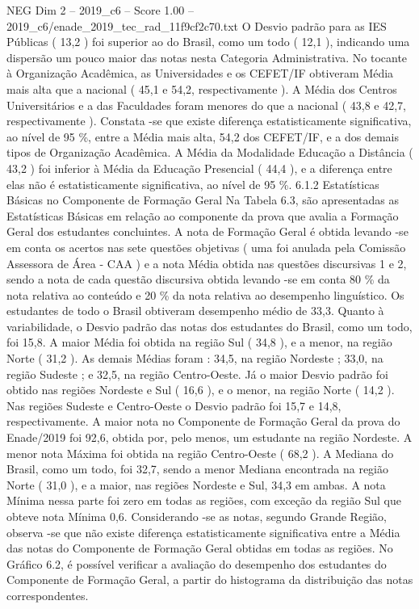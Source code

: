 \begin{textsample}{NEG Dim 2 – 2019\_c6 – Score 1.00 – 2019\_c6/enade\_2019\_tec\_rad\_11f9cf2c70.txt}
O Desvio padrão para as IES Públicas ( 13,2 ) foi superior ao do Brasil, como um todo ( 12,1 ), indicando uma dispersão um pouco maior das notas nesta Categoria Administrativa.
No tocante à Organização Acadêmica, as Universidades e os CEFET/IF obtiveram Média mais alta que a nacional ( 45,1 e 54,2, respectivamente ).
A Média dos Centros Universitários e a das Faculdades foram menores do que a nacional ( 43,8 e 42,7, respectivamente ).
Constata -se que existe diferença estatisticamente significativa, ao nível de 95 \%, entre a Média mais alta, 54,2 dos CEFET/IF, e a dos demais tipos de Organização Acadêmica.
A Média da Modalidade Educação a Distância ( 43,2 ) foi inferior à Média da Educação Presencial ( 44,4 ), e a diferença entre elas não é estatisticamente significativa, ao nível de 95 \%. 6.1.2 Estatísticas Básicas no Componente de Formação Geral Na Tabela 6.3, são apresentadas as Estatísticas Básicas em relação ao componente da prova que avalia a Formação Geral dos estudantes concluintes.
A nota de Formação Geral é obtida levando -se em conta os acertos nas sete questões objetivas ( uma foi anulada pela Comissão Assessora de Área - CAA ) e a nota Média obtida nas questões discursivas 1 e 2, sendo a nota de cada questão discursiva obtida levando -se em conta 80 \% da nota relativa ao conteúdo e 20 \% da nota relativa ao desempenho linguístico.
Os estudantes de todo o Brasil obtiveram desempenho médio de 33,3.
Quanto à variabilidade, o Desvio padrão das notas dos estudantes do Brasil, como um todo, foi 15,8.
A maior Média foi obtida na região Sul ( 34,8 ), e a menor, na região Norte ( 31,2 ).
As demais Médias foram : 34,5, na região Nordeste ; 33,0, na região Sudeste ; e 32,5, na região Centro-Oeste.
Já o maior Desvio padrão foi obtido nas regiões Nordeste e Sul ( 16,6 ), e o menor, na região Norte ( 14,2 ).
Nas regiões Sudeste e Centro-Oeste o Desvio padrão foi 15,7 e 14,8, respectivamente.
A maior nota no Componente de Formação Geral da prova do Enade/2019 foi 92,6, obtida por, pelo menos, um estudante na região Nordeste.
A menor nota Máxima foi obtida na região Centro-Oeste ( 68,2 ).
A Mediana do Brasil, como um todo, foi 32,7, sendo a menor Mediana encontrada na região Norte ( 31,0 ), e a maior, nas regiões Nordeste e Sul, 34,3 em ambas.
A nota Mínima nessa parte foi zero em todas as regiões, com exceção da região Sul que obteve nota Mínima 0,6.
Considerando -se as notas, segundo Grande Região, observa -se que não existe diferença estatisticamente significativa entre a Média das notas do Componente de Formação Geral obtidas em todas as regiões.
No Gráfico 6.2, é possível verificar a avaliação do desempenho dos estudantes do Componente de Formação Geral, a partir do histograma da distribuição das notas correspondentes.

\end{textsample}
